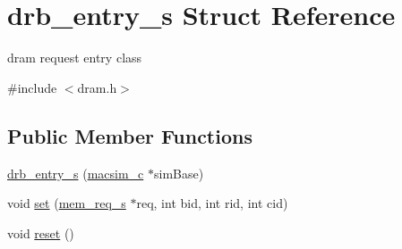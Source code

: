 \hypertarget{structdrb__entry__s}{
\section{drb\_\-entry\_\-s Struct Reference}
\label{structdrb__entry__s}
}


dram request entry class  




{\ttfamily \#include $<$dram.h$>$}

\subsection*{Public Member Functions}
\begin{DoxyCompactItemize}
\item 
\hyperlink{structdrb__entry__s_acc45beb7376b2f0d875a367292a628c9}{drb\_\-entry\_\-s} (\hyperlink{classmacsim__c}{macsim\_\-c} $\ast$simBase)
\item 
void \hyperlink{structdrb__entry__s_a22b640f999168fd5b85ddddc1b245494}{set} (\hyperlink{structmem__req__s}{mem\_\-req\_\-s} $\ast$req, int bid, int rid, int cid)
\item 
void \hyperlink{structdrb__entry__s_a51c1466ba9f805bd281b7183cbcb8796}{reset} ()
\end{DoxyCompactItemize}
